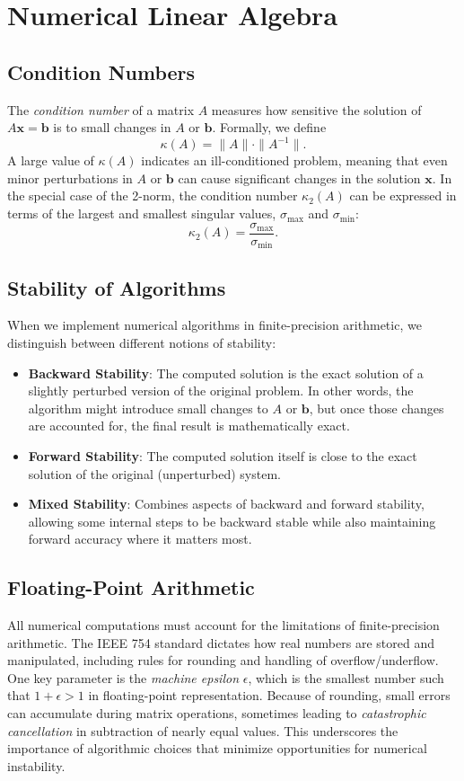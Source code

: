 \section{Numerical Linear Algebra}

\subsection{Condition Numbers}
The \emph{condition number} of a matrix \(A\) measures how sensitive the solution of \(A \mathbf{x} = \mathbf{b}\) 
is to small changes in \(A\) or \(\mathbf{b}\). Formally, we define
\[
\kappa(A) = \|A\|\cdot\|A^{-1}\|.
\]
A large value of \(\kappa(A)\) indicates an ill-conditioned problem, meaning that even minor perturbations in \(A\) 
or \(\mathbf{b}\) can cause significant changes in the solution \(\mathbf{x}\). In the special case of the 2-norm, 
the condition number \(\kappa_2(A)\) can be expressed in terms of the largest and smallest singular values, 
\(\sigma_{\max}\) and \(\sigma_{\min}\):
\[
\kappa_2(A) = \frac{\sigma_{\max}}{\sigma_{\min}}.
\]

\subsection{Stability of Algorithms}
When we implement numerical algorithms in finite-precision arithmetic, we distinguish between different notions of stability:
\begin{itemize}
    \item \textbf{Backward Stability}: 
    The computed solution is the exact solution of a slightly perturbed version of the original problem. In other words, 
    the algorithm might introduce small changes to \(A\) or \(\mathbf{b}\), but once those changes are accounted for, 
    the final result is mathematically exact.
    \item \textbf{Forward Stability}: 
    The computed solution itself is close to the exact solution of the original (unperturbed) system.
    \item \textbf{Mixed Stability}: 
    Combines aspects of backward and forward stability, allowing some internal steps to be backward stable while also 
    maintaining forward accuracy where it matters most.
\end{itemize}

\subsection{Floating-Point Arithmetic}
All numerical computations must account for the limitations of finite-precision arithmetic. The IEEE 754 standard 
dictates how real numbers are stored and manipulated, including rules for rounding and handling of overflow/underflow. 
One key parameter is the \emph{machine epsilon} \(\epsilon\), which is the smallest number such that \(1 + \epsilon > 1\) 
in floating-point representation. Because of rounding, small errors can accumulate during matrix operations, sometimes 
leading to \emph{catastrophic cancellation} in subtraction of nearly equal values. This underscores the importance of 
algorithmic choices that minimize opportunities for numerical instability.


